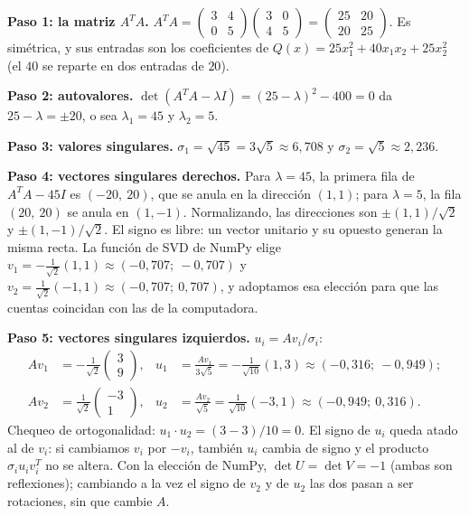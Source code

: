 \begin{ejemplo}[SVD a mano de \(A=\left(\begin{smallmatrix}3&0\\4&5\end{smallmatrix}\right)\)]\label{ej:svd-mano}
\textbf{Paso 1: la matriz \(A^TA\).}
\(A^TA=\left(\begin{smallmatrix}3&4\\0&5\end{smallmatrix}\right)
\left(\begin{smallmatrix}3&0\\4&5\end{smallmatrix}\right)
=\left(\begin{smallmatrix}25&20\\20&25\end{smallmatrix}\right)\). Es simétrica, y sus entradas son los coeficientes de \(Q(x)=25x_1^2+40x_1x_2+25x_2^2\) (el
\(40\) se reparte en dos entradas de \(20\)).

\textbf{Paso 2: autovalores.} \(\det(A^TA-\lambda I)=(25-\lambda)^2-400=0\) da
\(25-\lambda=\pm20\), o sea \(\lambda_1=45\) y \(\lambda_2=5\).

\textbf{Paso 3: valores singulares.}
\(\sigma_1=\sqrt{45}=3\sqrt5\approx6{,}708\) y \(\sigma_2=\sqrt5\approx2{,}236\).

\textbf{Paso 4: vectores singulares derechos.} Para \(\lambda=45\), la primera fila de
\(A^TA-45I\) es \((-20,\ 20)\), que se anula en la dirección \((1,1)\); para \(\lambda=5\),
la fila \((20,\ 20)\) se anula en \((1,-1)\). Normalizando, las direcciones son
\(\pm(1,1)/\sqrt2\) y \(\pm(1,-1)/\sqrt2\). El signo es libre: un vector unitario y su
opuesto generan la misma recta. La función de SVD de NumPy elige
\(v_1=-\tfrac1{\sqrt2}(1,1)\approx(-0{,}707;\ -0{,}707)\) y
\(v_2=\tfrac1{\sqrt2}(-1,1)\approx(-0{,}707;\ 0{,}707)\), y adoptamos esa elección para que las cuentas coincidan con las de la computadora.

\textbf{Paso 5: vectores singulares izquierdos.} \(u_i=Av_i/\sigma_i\):
\begin{align*}
  Av_1&=-\tfrac1{\sqrt2}\begin{pmatrix}3\\9\end{pmatrix}, &
  u_1&=\frac{Av_1}{3\sqrt5}=-\tfrac1{\sqrt{10}}(1,3)\approx(-0{,}316;\ -0{,}949);\\
  Av_2&=\tfrac1{\sqrt2}\begin{pmatrix}-3\\1\end{pmatrix}, &
  u_2&=\frac{Av_2}{\sqrt5}=\tfrac1{\sqrt{10}}(-3,1)\approx(-0{,}949;\ 0{,}316).
\end{align*}
Chequeo de ortogonalidad: \(u_1\cdot u_2=(3-3)/10=0\). El signo de \(u_i\) queda atado al de
\(v_i\): si cambiamos \(v_i\) por \(-v_i\), también \(u_i\) cambia de signo y el producto
\(\sigma_iu_iv_i^T\) no se altera. Con la elección de NumPy, \(\det U=\det V=-1\) (ambas son
reflexiones); cambiando a la vez el signo de \(v_2\) y de \(u_2\) las dos pasan a ser
rotaciones, sin que cambie \(A\).


\end{ejemplo}
